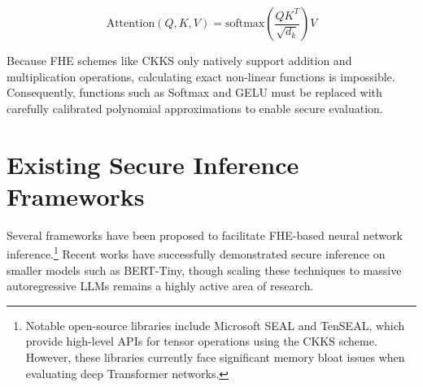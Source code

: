 \begin{equation}
    \text{Attention}(Q, K, V) = \text{softmax}\left(\frac{QK^T}{\sqrt{d_k}}\right)V
\end{equation}

Because FHE schemes like CKKS only natively support addition and multiplication operations, calculating exact non-linear functions is impossible. Consequently, functions such as Softmax and GELU must be replaced with carefully calibrated polynomial approximations to enable secure evaluation.

\section{Existing Secure Inference Frameworks}
Several frameworks have been proposed to facilitate FHE-based neural network inference.\footnote{Notable open-source libraries include Microsoft SEAL and TenSEAL, which provide high-level APIs for tensor operations using the CKKS scheme. However, these libraries currently face significant memory bloat issues when evaluating deep Transformer networks.} Recent works have successfully demonstrated secure inference on smaller models such as BERT-Tiny, though scaling these techniques to massive autoregressive LLMs remains a highly active area of research.